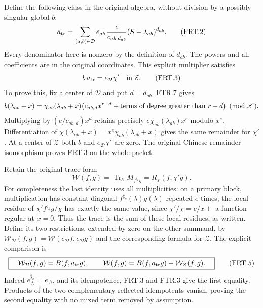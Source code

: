 Define the following class in the original algebra, without division
by a possibly singular global $b$:
\[
 a_{\rm tr}=\sum_{(a,b)\in\mathcal D}
       e_{ab}\,\frac{e}{c_{ab,d_{ab}}}
                          (S-\lambda_{ab})^{d_{ab}}.
 \tag{FRT.2}
\]
Every denominator here is nonzero by the definition of $d_{ab}$.
The powers and all coefficients are in the original coordinates.
This explicit multiplier satisfies
\[
 b\,a_{\rm tr}=e_{\mathcal D}\chi'\quad\hbox{in }\mathcal E.
 \tag{FRT.3}
\]
To prove this, fix a center of $\mathcal D$ and put $d=d_{ab}$.
FTR.7 gives
\[
 b(\lambda_{ab}+x)=
 \chi_{ab}(\lambda_{ab}+x)
       \bigl(c_{ab,d}x^{r-d}+
                      \hbox{terms of degree greater than }r-d\bigr)
                         \pmod{x^e}.
\]
Multiplying by $(e/c_{ab,d})x^d$ retains precisely
$e\chi_{ab}(\lambda_{ab})x^r$ modulo $x^e$. Differentiation of
$\chi(\lambda_{ab}+x)=x^e\chi_{ab}(\lambda_{ab}+x)$ gives the
same remainder for $\chi'$. At a center of $\mathcal Z$ both
$b$ and $e_{\mathcal D}\chi'$ are zero. The original
Chinese-remainder isomorphism proves FRT.3 on the whole packet.

Retain the original trace form
\[
 \mathcal W(f,g)=\operatorname{Tr}_{\mathcal E}
                      M_{f^{\sharp_k}g}=R_\chi(f,\chi'g).
 \tag{FRT.4}
\]
For completeness the last identity uses all multiplicities: on a
primary block, multiplication has constant diagonal $f^{\sharp_k}(\lambda)
g(\lambda)$ repeated $e$ times; the local residue of
$\chi'f^{\sharp_k}g/\chi$ has exactly the same value, since
$\chi'/\chi=e/x+$ a function regular at $x=0$.
Thus the trace is the sum of these local residues, as written.
Define its two restrictions, extended by zero on the other summand,
by $\mathcal W_{\mathcal D}(f,g)=\mathcal W(e_{\mathcal D}f,
e_{\mathcal D}g)$ and the corresponding formula for $\mathcal Z$.
The explicit comparison is
\[
 \boxed{\quad
 \mathcal W_{\mathcal D}(f,g)=B(f,a_{\rm tr}g),\qquad
 \mathcal W(f,g)=B(f,a_{\rm tr}g)+\mathcal W_{\mathcal Z}(f,g).
 \quad}\tag{FRT.5}
\]
Indeed $e_{\mathcal D}^{\sharp_k}=e_{\mathcal D}$, and its
idempotence, FRT.3 and FTR.3 give the first equality. Products of
the two complementary reflected idempotents vanish, proving the
second equality with no mixed term removed by assumption.


